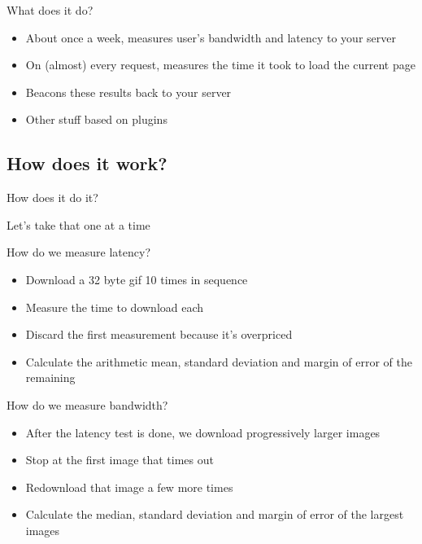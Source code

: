 \documentclass{beamer}
\begin{document}
\begin{frame}{What does it do?}
  \begin{itemize}
  \item About once a week, measures user's bandwidth and latency to your server
  \item On (almost) every request, measures the time it took to load the current page
  \item Beacons these results back to your server
  \item Other stuff based on plugins
  \end{itemize}
\end{frame}

\subsection{How does it work?}

\begin{frame}{How does it do it?}
  \begin{center}
  Let's take that one at a time
  \end{center}
\end{frame}

\begin{frame}{How do we measure latency?}
  \begin{itemize}
  \item Download a 32 byte gif 10 times in sequence
  \item Measure the time to download each
  \item Discard the first measurement because it's overpriced
  \item Calculate the arithmetic mean, standard deviation and margin of error of the remaining
  \end{itemize}
\end{frame}

\begin{frame}{How do we measure bandwidth?}
  \begin{itemize}
  \item After the latency test is done, we download progressively larger images
  \item Stop at the first image that times out
  \item Redownload that image a few more times
  \item Calculate the median, standard deviation and margin of error of the largest images
  \end{itemize}
\end{frame}
\end{document}

